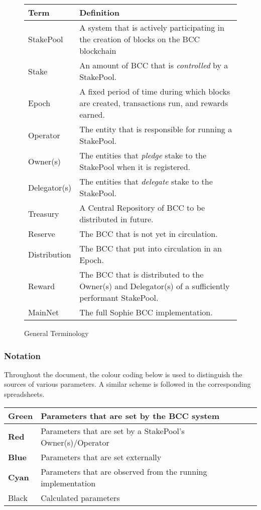 \documentclass[11pt,a4paper,dvipsnames,twosided,final]{article}
\newcommand{\bcc}{BCC{}}
\newcommand{\bcc}[1]{Bcc}
\begin{document}
\begin{figure}[t]
  \begin{center}
\begin{tabular}{||l|p{12cm}||}
  \hline \hline
\textbf{Term} & \textbf{Definition} \\\hline
  StakePool & A system that is actively participating in the creation of blocks on the \bcc{} blockchain  \\\hline
  Stake & An amount of \bcc{} that is \emph{controlled} by a StakePool.\\\hline
  Epoch & A fixed period of time during which blocks are created, transactions run, and rewards earned.\\\hline
Operator & The entity that is responsible for running a StakePool. \\\hline
Owner(s) & The entities that \emph{pledge} stake to the StakePool when it is registered. \\\hline
  Delegator(s) & The entities that \emph{delegate} stake to the StakePool.\\\hline
  Treasury & A Central Repository of \bcc{} to be distributed in future.\\\hline
  Reserve & The \bcc{} that is not yet in circulation.\\\hline
  Distribution & The \bcc{} that put into circulation in an Epoch.\\\hline
  Reward & The \bcc{} that is distributed to the Owner(s) and Delegator(s) of a sufficiently performant StakePool.\\\hline
  MainNet & The full Sophie \bcc{} implementation.\\\hline
  \hline
\end{tabular}
\end{center}
\caption{General Terminology}
\label{fig:terminology}
\end{figure}

\newpage
\subsubsection*{Notation}

Throughout the document, the colour coding below is used to distinguish the sources of various parameters.
A similar scheme is followed in the corresponding spreadsheets.

\begin{tabular}{||l|l||}\hline\hline
  \textbf{\color{green} Green} & Parameters that are set by the \bcc{} system \\\hline
  \textbf{\color{red} Red} & Parameters that are set by a StakePool's Owner(s)/Operator \\\hline
  \textbf{\color{blue} Blue} & Parameters that are set externally \\\hline
  \textbf{\color{cyan} Cyan} & Parameters that are observed from the running implementation \\\hline
  Black & Calculated parameters \\\hline
\hline
\end{tabular}
\end{document}
